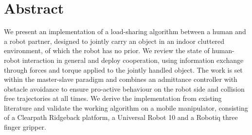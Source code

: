 \chapter*{Abstract}

We present an implementation of a load-sharing algorithm between a human and a robot partner, designed to jointly carry an object in an indoor cluttered environment, of which the robot has no prior. We review the state of human-robot interaction in general and deploy cooperation, using information exchange through forces and torque applied to the jointly handled object. The work is set within the master-slave paradigm and combines an admittance controller with obstacle avoidance to ensure pro-active behaviour on the robot side and collision free trajectories at all times. We derive the implementation from existing literature and validate the working algorithm on a mobile manipulator, consisting of a Clearpath Ridgeback platform, a Universal Robot 10 and a Robotiq three finger gripper.